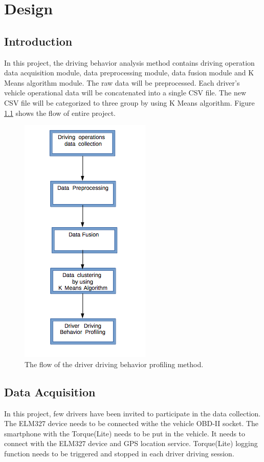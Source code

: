 \chapter{Design}
\section{Introduction}
In this project, the driving behavior analysis method contains driving operation data acquisition module, data preprocessing module, data fusion module and K Means algorithm module. The raw data will be preprocessed. Each driver's vehicle operational data will be concatenated into a single CSV file. The new CSV file will be categorized to three group by using K Means algorithm. Figure \ref{fig:projectflow} shows the flow of entire project.

\begin{figure}[hbt!]\centering
\includegraphics[height=.4\textheight]{image/flowchart}
\caption{The flow of the driver driving behavior profiling method. }
\label{fig:projectflow}
\end{figure}

\section{Data Acquisition}
In this project, few drivers have been invited to participate in the data collection. The ELM327 device needs to be connected withe the vehicle OBD-II socket. The smartphone with the Torque(Lite) needs to be put in the vehicle. It needs to connect with the ELM327 device and GPS location service. Torque(Lite) logging function needs to be triggered and stopped in each driver driving session. 

